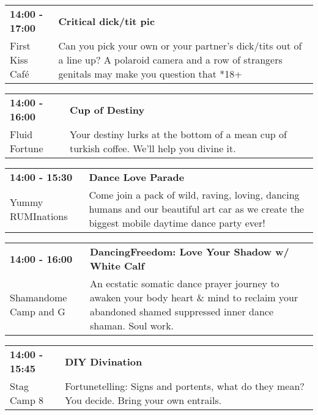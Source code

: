 \begin{tabular}{ p{1in} p{2.2in} }
    \textbf{14:00 - 17:00} & \textbf{Critical dick/tit pic} \\
    First Kiss Caf\'e \newline  & Can you pick your own or your partner's dick/tits out of a line up?  A polaroid camera and a row of strangers genitals may make you question that *18+ \\
    \hline 
\end{tabular}
    
\begin{tabular}{ p{1in} p{2.2in} }
    \textbf{14:00 - 16:00} & \textbf{Cup of Destiny} \\
    Fluid Fortune \newline  & Your destiny lurks at the bottom of a mean cup of turkish coffee. We'll help you divine it. \\
    \hline 
\end{tabular}
    
\begin{tabular}{ p{1in} p{2.2in} }
    \textbf{14:00 - 15:30} & \textbf{Dance Love Parade} \\
    Yummy RUMInations \newline  & Come join a pack of wild, raving, loving, dancing humans and our beautiful art car as we create the biggest mobile daytime dance party ever! \\
    \hline 
\end{tabular}
    
\begin{tabular}{ p{1in} p{2.2in} }
    \textbf{14:00 - 16:00} & \textbf{ DancingFreedom: Love Your Shadow w/ White Calf} \\
    Shamandome Camp \newline 615 and G & An ecstatic somatic dance prayer journey to awaken your body heart \& mind to reclaim your abandoned shamed suppressed inner dance shaman. Soul work. \\
    \hline 
\end{tabular}
    
\begin{tabular}{ p{1in} p{2.2in} }
    \textbf{14:00 - 15:45} & \textbf{DIY Divination} \\
    Stag Camp 8 \newline  & Fortunetelling: Signs and portents, what do they mean? You decide. Bring your own entrails. \\
    \hline 
\end{tabular}
    
